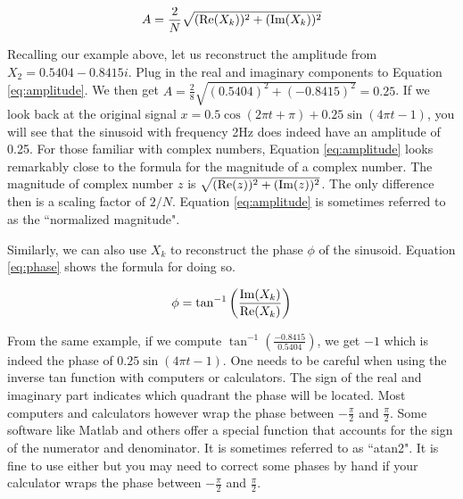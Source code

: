 \begin{equation}
\label{eq:amplitude}
	A = \frac{2}{N}\sqrt{(\mathrm{Re}(X_k))^2 + (\mathrm{Im}(X_k))^2}
\end{equation}

Recalling our example above, let us reconstruct the amplitude from $X_2 = 0.5404 - 0.8415i$.  Plug in 
the real and imaginary components to Equation \ref{eq:amplitude}.  We then get 
$A = \frac{2}{8}\sqrt{(0.5404)^2 + (-0.8415)^2} = 0.25$.  If we look back at the original signal $x =
0.5\cos(2\pi t + \pi) + 0.25\sin(4\pi t - 1)$, you will see that the sinusoid with frequency 2Hz does indeed
have an amplitude of 0.25.  For those familiar with complex numbers, Equation \ref{eq:amplitude} looks 
remarkably close to the formula for the magnitude of a complex number.  The magnitude of complex number
$z$ is $\sqrt{(\mathrm{Re}(z))^2 + (\mathrm{Im}(z))^2}$.  The only difference then is a scaling factor of $2/N$.  Equation \ref{eq:amplitude}
is sometimes referred to as the ``normalized magnitude".

Similarly, we can also use $X_k$ to reconstruct the phase $\phi$ of the sinusoid.  Equation \ref{eq:phase}
shows the formula for doing so.

\begin{equation}
\label{eq:phase}
\phi = \tan^{-1}\bigg(\frac{\mathrm{Im}{(X_k)}}{\mathrm{Re}{(X_k)}}\bigg)
\end{equation}

\noindent From the same example, if we compute $\tan^{-1}(\frac{-0.8415}{0.5404})$, we get $-1$ which is indeed the
phase of $0.25\sin(4\pi t - 1)$.  One needs to be careful when using the inverse tan function with computers
or calculators.  The sign of the real and imaginary part indicates which quadrant the phase will be located.  Most
computers and calculators however wrap the phase between $-\frac{\pi}{2}$ and $\frac{\pi}{2}$.  Some software
like Matlab and others offer a special function that accounts for the sign of the numerator and denominator.  It is sometimes referred to as ``atan2".  It is fine to use either but you may need to correct some phases by 
hand if your calculator wraps the phase between $-\frac{\pi}{2}$ and $\frac{\pi}{2}$.

